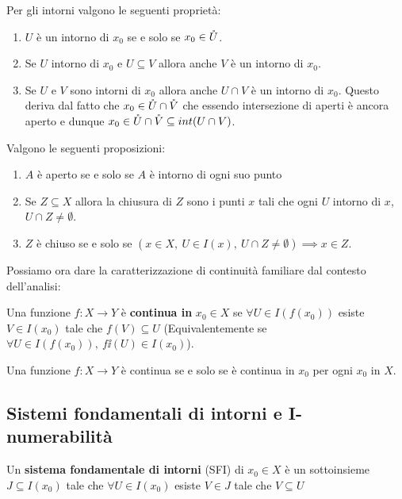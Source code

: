 \begin{multicols*}{2}
\begin{remark}
Per gli intorni valgono le seguenti proprietà:
\begin{enumerate}[noitemsep]
\item $U$ è un intorno di $x_0$ se e solo se $x_0\in {\mathring {U}}$.
\item Se $U$ intorno di $x_0$ e $U\subseteq V$ allora anche $V$ è un intorno di $x_0$.
\item Se $U$ e $V$ sono intorni di $x_0$ allora anche $U\cap V$ è un intorno di $x_0$. Questo deriva dal fatto che $x_0\in {\mathring {U}}\cap {\mathring {V}}$ che essendo intersezione di aperti è ancora aperto e dunque $x_0\in {\mathring {U}}\cap {\mathring {V}}\subseteq int(U\cap V)$.
\end{enumerate}
\end{remark}

\begin{proposition}\label{CaratterizzazioneApertiEChiusuraConIntorni}
Valgono le seguenti proposizioni:
\begin{enumerate}[noitemsep]
\item $A$ è aperto se e solo se $A$ è intorno di ogni suo punto
\item Se $Z\subseteq X$ allora la chiusura di $Z$ sono i punti $x$ tali che ogni $U$ intorno di $x$, $U\cap Z\neq\emptyset$.
\item $Z$ è chiuso se e solo se $(x\in X,\ U\in I(x),\ U\cap Z\neq\emptyset)\implies x\in Z$.
\end{enumerate}
\end{proposition}

\noindent Possiamo ora dare la caratterizzazione di continuità familiare dal contesto dell'analisi:
\begin{definition}
Una funzione $f:X\to Y$ è \textbf{continua in} $x_0\in X$ se $\forall U\in I(f(x_0))$ esiste $V\in I(x_0)$ tale che $f(V)\subseteq U$ (Equivalentemente se $\forall U\in I(f(x_0)),\ f\ii(U)\in I(x_0)$).
\end{definition}
\begin{proposition}\label{ContinuaEquivaleContinuaInOgniPunto}
Una funzione $f:X\to Y$ è continua se e solo se è continua in $x_0$ per ogni $x_0$ in $X$.
\end{proposition}

\subsection{Sistemi fondamentali di intorni e I-numerabilità}
\begin{definition}
Un \textbf{sistema fondamentale di intorni} (SFI) di $x_0\in X$ è un sottoinsieme $J\subseteq I(x_0)$ tale che $\forall U\in I(x_0)$ esiste $V\in J$ tale che $V\subseteq U$
\end{definition}


\end{multicols*}
